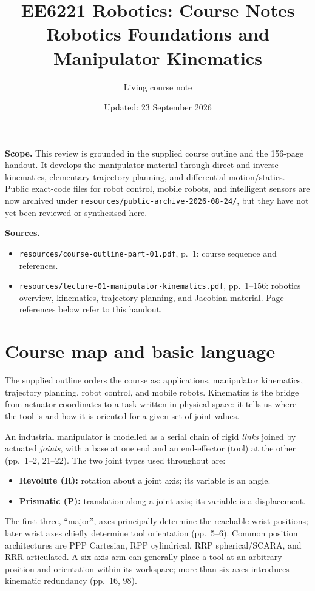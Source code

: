 \documentclass[11pt,a4paper]{article}
\title{EE6221 Robotics: Course Notes\\\large Robotics Foundations and Manipulator Kinematics}
\author{Living course note}
\date{Updated: 23 September 2026}
\renewcommand{\texttt}[1]{\nolinkurl{#1}}
\begin{document}
\maketitle

\noindent\textbf{Scope.} This review is grounded in the supplied course outline and the 156-page handout. It develops the manipulator material through direct and inverse kinematics, elementary trajectory planning, and differential motion/statics. Public exact-code files for robot control, mobile robots, and intelligent sensors are now archived under \texttt{resources/public-archive-2026-08-24/}, but they have not yet been reviewed or synthesised here.

\noindent\textbf{Sources.}
\begin{itemize}
  \item \texttt{resources/course-outline-part-01.pdf}, p.~1: course sequence and references.
  \item \texttt{resources/lecture-01-manipulator-kinematics.pdf}, pp.~1--156: robotics overview, kinematics, trajectory planning, and Jacobian material. Page references below refer to this handout.
\end{itemize}

\tableofcontents

\section{Course map and basic language}

The supplied outline orders the course as: applications, manipulator kinematics, trajectory planning, robot control, and mobile robots. Kinematics is the bridge from actuator coordinates to a task written in physical space: it tells us where the tool is and how it is oriented for a given set of joint values.

An industrial manipulator is modelled as a serial chain of rigid \emph{links} joined by actuated \emph{joints}, with a base at one end and an end-effector (tool) at the other (pp.~1--2, 21--22). The two joint types used throughout are:
\begin{itemize}
  \item \textbf{Revolute (R):} rotation about a joint axis; its variable is an angle.
  \item \textbf{Prismatic (P):} translation along a joint axis; its variable is a displacement.
\end{itemize}

The first three, ``major'', axes principally determine the reachable wrist positions; later wrist axes chiefly determine tool orientation (pp.~5--6). Common position architectures are PPP Cartesian, RPP cylindrical, RRP spherical/SCARA, and RRR articulated. A six-axis arm can generally place a tool at an arbitrary position and orientation within its workspace; more than six axes introduces kinematic redundancy (pp.~16, 98).
\end{document}
